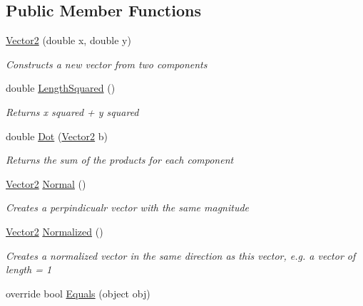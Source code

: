 \subsection*{Public Member Functions}
\begin{DoxyCompactItemize}
\item 
\mbox{\hyperlink{struct_eagle_eye_1_1_models_1_1_geometry_1_1_vector2_ab45ce16ef5b5d8abf10b92a8ce38bea0}{Vector2}} (double x, double y)
\begin{DoxyCompactList}\small\item\em Constructs a new vector from two components \end{DoxyCompactList}\item 
double \mbox{\hyperlink{struct_eagle_eye_1_1_models_1_1_geometry_1_1_vector2_a0164d7dc637cbdf4ace7b30aebaa3542}{Length\+Squared}} ()
\begin{DoxyCompactList}\small\item\em Returns x squared + y squared \end{DoxyCompactList}\item 
double \mbox{\hyperlink{struct_eagle_eye_1_1_models_1_1_geometry_1_1_vector2_ac438b69be09b24284a433e741b70a559}{Dot}} (\mbox{\hyperlink{struct_eagle_eye_1_1_models_1_1_geometry_1_1_vector2}{Vector2}} b)
\begin{DoxyCompactList}\small\item\em Returns the sum of the products for each component \end{DoxyCompactList}\item 
\mbox{\hyperlink{struct_eagle_eye_1_1_models_1_1_geometry_1_1_vector2}{Vector2}} \mbox{\hyperlink{struct_eagle_eye_1_1_models_1_1_geometry_1_1_vector2_aaf51a15fdc764b60449c16358a1520ee}{Normal}} ()
\begin{DoxyCompactList}\small\item\em Creates a perpindicualr vector with the same magnitude \end{DoxyCompactList}\item 
\mbox{\hyperlink{struct_eagle_eye_1_1_models_1_1_geometry_1_1_vector2}{Vector2}} \mbox{\hyperlink{struct_eagle_eye_1_1_models_1_1_geometry_1_1_vector2_a7b5b76cccf512fc7bbaae7121f16fa64}{Normalized}} ()
\begin{DoxyCompactList}\small\item\em Creates a normalized vector in the same direction as this vector, e.\+g. a vector of length = 1 \end{DoxyCompactList}\item 
override bool \mbox{\hyperlink{struct_eagle_eye_1_1_models_1_1_geometry_1_1_vector2_a5c16724484326fee5f9551a2b3c95f75}{Equals}} (object obj)

\end{DoxyCompactItemize}
